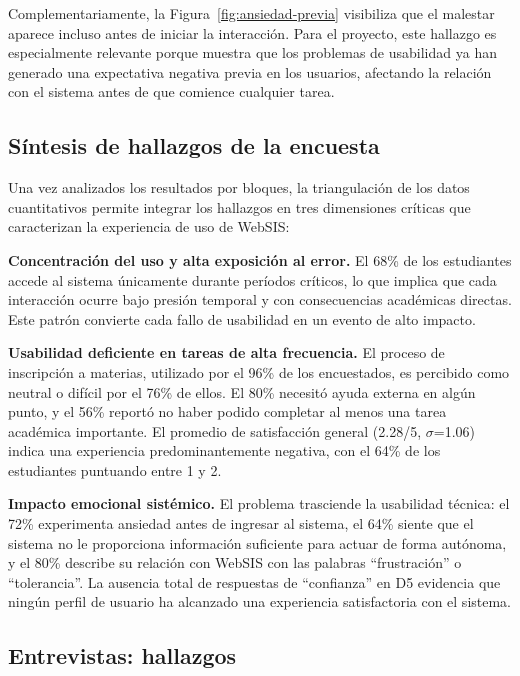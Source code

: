 Complementariamente, la Figura~\ref{fig:ansiedad-previa} visibiliza que el malestar aparece incluso antes de iniciar la interacción. Para el proyecto, este hallazgo es especialmente relevante porque muestra que los problemas de usabilidad ya han generado una expectativa negativa previa en los usuarios, afectando la relación con el sistema antes de que comience cualquier tarea.
 
\subsection{Síntesis de hallazgos de la encuesta}
 
Una vez analizados los resultados por bloques, la triangulación de los datos cuantitativos permite integrar los hallazgos en tres dimensiones críticas que caracterizan la experiencia de uso de WebSIS:
 
\textbf{Concentración del uso y alta exposición al error.} El 68\% de los estudiantes accede al sistema únicamente durante períodos críticos, lo que implica que cada interacción ocurre bajo presión temporal y con consecuencias académicas directas. Este patrón convierte cada fallo de usabilidad en un evento de alto impacto.
 
\textbf{Usabilidad deficiente en tareas de alta frecuencia.} El proceso de inscripción a materias, utilizado por el 96\% de los encuestados, es percibido como neutral o difícil por el 76\% de ellos. El 80\% necesitó ayuda externa en algún punto, y el 56\% reportó no haber podido completar al menos una tarea académica importante. El promedio de satisfacción general (2.28/5, $\sigma$=1.06) indica una experiencia predominantemente negativa, con el 64\% de los estudiantes puntuando entre 1 y 2.
 
\textbf{Impacto emocional sistémico.} El problema trasciende la usabilidad técnica: el 72\% experimenta ansiedad antes de ingresar al sistema, el 64\% siente que el sistema no le proporciona información suficiente para actuar de forma autónoma, y el 80\% describe su relación con WebSIS con las palabras ``frustración'' o ``tolerancia''. La ausencia total de respuestas de ``confianza'' en D5 evidencia que ningún perfil de usuario ha alcanzado una experiencia satisfactoria con el sistema.

\subsection{Entrevistas: hallazgos}

